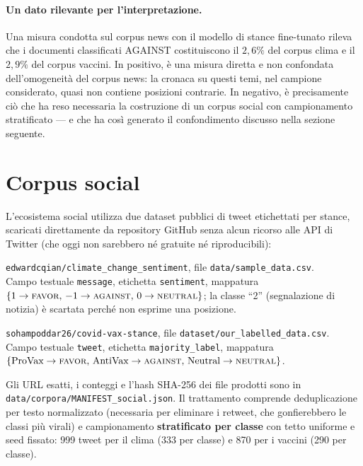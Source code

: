 \documentclass[11pt,a4paper]{report}
\begin{document}
\paragraph{Un dato rilevante per l'interpretazione.}\label{sec:against-news}
Una misura condotta sul corpus news con il modello di stance fine-tunato rileva che i documenti
classificati AGAINST costituiscono il \textbf{$2{,}6\%$} del corpus clima e il
\textbf{$2{,}9\%$} del corpus vaccini. In positivo, è una misura diretta e non confondata
dell'omogeneità del corpus news: la cronaca su questi temi, nel campione considerato, quasi non
contiene posizioni contrarie. In negativo, è precisamente ciò che ha reso necessaria la
costruzione di un corpus social con campionamento stratificato --- e che ha così generato il
confondimento discusso nella sezione seguente.

\section{Corpus social}\label{sec:corpus-social}
L'ecosistema social utilizza due dataset pubblici di tweet etichettati per stance, scaricati
direttamente da repository GitHub senza alcun ricorso alle API di Twitter (che oggi non
sarebbero né gratuite né riproducibili):

\begin{description}[leftmargin=1.1cm,style=nextline]
  \item[Clima] \small
        \texttt{edwardcqian/climate\_change\_sentiment}, file \texttt{data/sample\_data.csv}.\\
        Campo testuale \texttt{message}, etichetta \texttt{sentiment}, mappatura
        $\{1 \to \textsc{favor},\, -1 \to \textsc{against},\, 0 \to \textsc{neutral}\}$; la
        classe ``2'' (segnalazione di notizia) è scartata perché non esprime una posizione.
  \item[Vaccini] \small
        \texttt{sohampoddar26/covid-vax-stance}, file
        \texttt{dataset/our\_labelled\_data.csv}.\\
        Campo testuale \texttt{tweet}, etichetta \texttt{majority\_label}, mappatura
        $\{\text{ProVax} \to \textsc{favor},\, \text{AntiVax} \to \textsc{against},\,
        \text{Neutral} \to \textsc{neutral}\}$.
\end{description}

Gli URL esatti, i conteggi e l'hash SHA-256 dei file prodotti sono in
\texttt{data/corpora/}\allowbreak\texttt{MANIFEST\_social.json}. Il trattamento comprende
deduplicazione per testo normalizzato (necessaria per eliminare i retweet, che gonfierebbero le classi più virali) e
campionamento \textbf{stratificato per classe} con tetto uniforme e seed fissato: 999 tweet per
il clima (333 per classe) e 870 per i vaccini (290 per classe).
\end{document}
